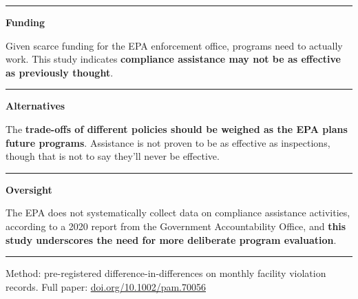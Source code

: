 \documentclass[
  10pt,
]{article}
\newcommand{\impcolsize}{\color{muted}\fontsize{8.25pt}{11.7pt}\selectfont}
\newcommand{\sectionhead}[1]{%
  \vspace{2pt}{\color{ink}\bfseries\fontsize{9.75pt}{12pt}\selectfont
  \textls[20]{\MakeUppercase{#1}}\par}\vspace{1pt}}
\newcommand{\colhead}[1]{%
  \noindent\textcolor{ink}{\rule{\linewidth}{1.5pt}}\par\vspace{2pt}%
  {\color{ink}\bfseries\fontsize{9pt}{11pt}\selectfont #1\par}\vspace{1pt}}
\newcommand{\impllink}[1]{{\bfseries\color{accentred}#1}}
\newcommand{\brieffooter}[1]{%
  \par\vfill
  \noindent\textcolor{warmrule}{\rule{\linewidth}{0.7pt}}\par\vspace{5pt}%
  {\color{faint}\fontsize{7.1pt}{9.5pt}\selectfont #1\par}}
\begin{document}
\vspace{0pt}

\sectionhead{Implications}

\noindent
\begin{minipage}[t]{0.310\linewidth}
\colhead{Funding}
{\impcolsize Given scarce funding for the EPA enforcement office, programs need to actually work. This study indicates \impllink{compliance assistance may not be as effective as previously thought}.\par}
\end{minipage}\hfill
\begin{minipage}[t]{0.310\linewidth}
\colhead{Alternatives}
{\impcolsize The \impllink{trade-offs of different policies should be weighed as the EPA plans future programs}. Assistance is not proven to be as effective as inspections, though that is not to say they'll never be effective.\par}
\end{minipage}\hfill
\begin{minipage}[t]{0.310\linewidth}
\colhead{Oversight}
{\impcolsize The EPA does not systematically collect data on compliance assistance activities, according to a 2020 report from the Government Accountability Office, and \impllink{this study underscores the need for more deliberate program evaluation}.\par}
\end{minipage}

\brieffooter{Method: pre-registered difference-in-differences on monthly facility violation records. Full paper: \href{https://doi.org/10.1002/pam.70056}{doi.org/10.1002/pam.70056}}
\end{document}
